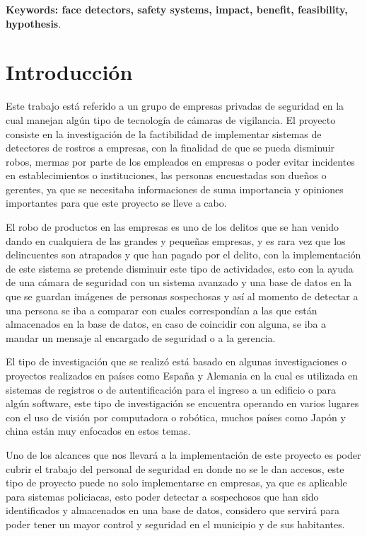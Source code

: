 \documentclass[12pt] {report}
\begin{document}
\textbf{\small Keywords: face detectors, safety systems, impact, benefit, feasibility, hypothesis}.

\section{Introducción}
Este trabajo está referido a un grupo de empresas privadas de seguridad en la cual manejan algún tipo de tecnología  de cámaras de vigilancia. El proyecto consiste en la investigación de la factibilidad de implementar sistemas de detectores de rostros a empresas, con la finalidad de que se pueda disminuir robos, mermas por parte de los empleados en empresas o poder evitar incidentes en establecimientos o instituciones, las personas encuestadas son dueños o gerentes, ya que se necesitaba informaciones de suma importancia y opiniones importantes para que este proyecto se lleve a cabo.

El robo de productos en las empresas es uno de los delitos que se han venido dando en cualquiera de las grandes y pequeñas empresas, y es rara vez que los delincuentes son atrapados y que han pagado por el delito, con la implementación de este sistema se pretende disminuir este tipo de actividades, esto con la ayuda de una cámara de seguridad con un sistema avanzado y una base de datos en la que se guardan imágenes de personas sospechosas y así al momento de detectar a una persona se iba a comparar con cuales correspondían a las que están almacenados en la base de datos, en caso de coincidir con alguna, se iba a mandar un mensaje al encargado de seguridad o a la gerencia.

El tipo de investigación que se realizó está basado en algunas investigaciones o proyectos realizados en países como España y Alemania en la cual es utilizada en sistemas de registros o de autentificación para el ingreso a un edificio o para algún software, este tipo de investigación se encuentra operando en varios lugares con el uso de visión por computadora o robótica, muchos países como Japón y china están muy enfocados en estos temas.

Uno de los alcances que nos llevará a la implementación de este proyecto es poder cubrir el trabajo del personal de seguridad en donde no se le dan accesos, este tipo de proyecto puede no solo implementarse en empresas, ya que es aplicable para sistemas policiacas, esto poder detectar a sospechosos que han sido identificados y almacenados en una base de datos, considero que servirá para poder tener un mayor control y seguridad en el municipio y de sus habitantes.
\end{document}
